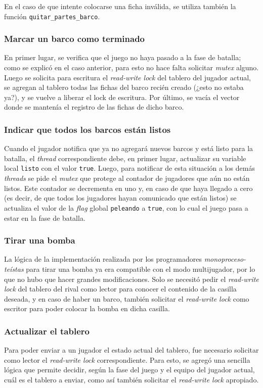 \documentclass[a4paper]{article}
\begin{document}
En el caso de que intente colocarse una ficha inválida, se utiliza también la
función \texttt{quitar\_partes\_barco}.


\subsubsection{Marcar un barco como terminado}

En primer lugar, se verifica que el juego no haya pasado a la fase de batalla;
como se explicó en el caso anterior, para esto no hace falta solicitar
\emph{mutex} alguno. Luego se solicita para escritura el \emph{read-write
lock} del tablero del jugador actual, se agregan al tablero todas las fichas
del barco recién creado (¿esto no estaba ya?), y se vuelve a liberar el lock
de escritura. Por último, se vacía el vector donde se mantenía el registro de
las fichas de dicho barco.

\subsubsection{Indicar que todos los barcos están listos}
Cuando el jugador notifica que ya no agregará nuevos barcos y está listo para
la batalla, el \emph{thread} correspondiente debe, en primer lugar, actualizar
su variable local \texttt{listo} con el valor \texttt{true}. Luego, para
notificar de esta situación a los demás \emph{threads} se pide el
\emph{mutex} que protege al contador de jugadores que aún no están listos.
Este contador se decrementa en uno y, en caso de que haya llegado a cero (es
decir, de que todos los jugadores hayan comunicado que están listos) se
actualiza el valor de la \emph{flag} global \texttt{peleando} a \texttt{true},
con lo cual el juego pasa a estar en la fase de batalla.

\subsubsection{Tirar una bomba}
La lógica de la implementación realizada por los programadores \emph
{monoproceso-teístas} para tirar una bomba ya era compatible con el modo
multijugador, por lo que no hubo que hacer grandes modificaciones. Solo se
necesitó pedir el \emph{read-write lock} del tablero del rival como lector
para conocer el contenido de la casilla deseada, y en caso de haber un barco,
también solicitar el \emph{read-write lock} como escritor para poder colocar
la bomba en dicha casilla.

\subsubsection{Actualizar el tablero}
Para poder enviar a un jugador el estado actual del tablero, fue necesario
solicitar como lector el \emph{read-write lock} correspondiente. Para esto,
se agregó una sencilla lógica que permite decidir, según la fase del juego y
el equipo del jugador actual, cuál es el tablero a enviar, como así también
solicitar el \emph{read-write lock} apropiado.
\end{document}

